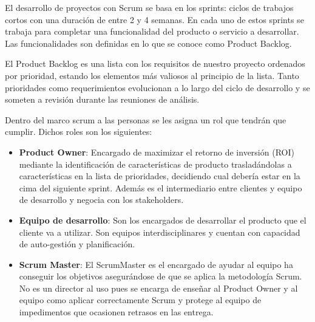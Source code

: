 El desarrollo de proyectos con Scrum se basa en los sprints: ciclos de trabajos cortos con una duración de entre 2 y 4 semanas. En cada uno de estos sprints se trabaja para completar una funcionalidad del producto o servicio a desarrollar. Las funcionalidades son definidas en lo que se conoce como Product Backlog.  

El Product Backlog es una lista con los requisitos de nuestro proyecto ordenados por prioridad, estando los elementos más valiosos al principio de la lista. Tanto prioridades como requerimientos evolucionan a lo largo del ciclo de desarrollo y se someten a revisión durante las reuniones de análisis.

Dentro del marco scrum a las personas se les asigna un rol que tendrán que cumplir. Dichos roles son los siguientes: 
\begin{itemize}
    \item \textbf{Product Owner}: Encargado de maximizar el retorno de inversión (ROI) mediante la identificación de características de producto trasladándolas a características en la lista de prioridades, decidiendo cual debería estar en la cima del siguiente sprint. Además es el intermediario entre clientes y equipo de desarrollo y negocia con los stakeholders.
    \item \textbf{Equipo de desarrollo}: Son los encargados de desarrollar el producto que el cliente va a utilizar. Son equipos interdisciplinares y cuentan con capacidad de auto-gestión y planificación.
    \item \textbf{Scrum Master}: El ScrumMaster es el encargado de ayudar al equipo ha conseguir los objetivos asegurándose de que se aplica la metodología Scrum. No es un director al uso pues se encarga de enseñar al Product Owner y al equipo como aplicar correctamente Scrum y protege al equipo de impedimentos que ocasionen retrasos en las entrega.
\end{itemize}

